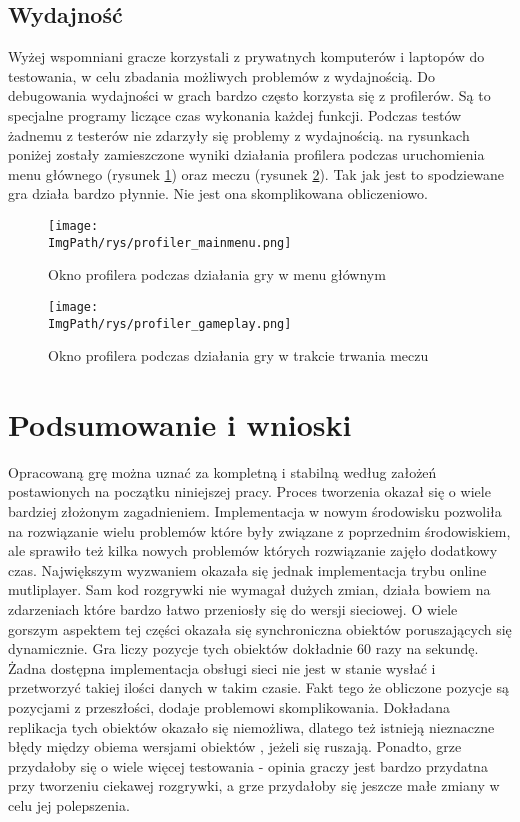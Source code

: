 \documentclass[a4paper,12pt,twoside,openany]{report}
\newcommand{\ImgPath}{.}
\begin{document}
\section{Wydajność}
Wyżej wspomniani gracze korzystali z prywatnych komputerów i laptopów do testowania, w celu zbadania możliwych problemów z wydajnością. Do debugowania wydajności w grach bardzo często korzysta się z profilerów. Są to specjalne programy liczące czas wykonania każdej funkcji. Podczas testów żadnemu z testerów nie zdarzyły się problemy z wydajnością. na rysunkach poniżej zostały zamieszczone wyniki działania profilera podczas uruchomienia menu głównego (rysunek \ref{profiler_mainmenu}) oraz meczu (rysunek \ref{profiler_gameplay}). Tak jak jest to spodziewane gra działa bardzo płynnie. Nie jest ona skomplikowana obliczeniowo.

\begin{figure}[H]
	\begin{center}
\centering
\texttt{[image: \\ImgPath/rys/profiler\_mainmenu.png]}
\end{center}
	\caption{Okno profilera podczas działania gry w menu głównym}
	\label{profiler_mainmenu}
\end{figure}

\begin{figure}[H]
	\begin{center}
\centering
\texttt{[image: \\ImgPath/rys/profiler\_gameplay.png]}
\end{center}
	\caption{Okno profilera podczas działania gry w trakcie trwania meczu}
	\label{profiler_gameplay}
\end{figure}

\chapter{Podsumowanie i wnioski }
Opracowaną grę można uznać za kompletną i stabilną według założeń postawionych na początku niniejszej pracy. Proces tworzenia okazał się o wiele bardziej złożonym zagadnieniem. Implementacja w nowym środowisku pozwoliła na rozwiązanie wielu problemów które były związane z poprzednim środowiskiem, ale sprawiło też kilka nowych problemów których rozwiązanie zajęło dodatkowy czas. Największym wyzwaniem okazała się jednak implementacja trybu online mutliplayer. Sam kod rozgrywki nie wymagał dużych zmian, działa bowiem na zdarzeniach które bardzo łatwo przeniosły się do wersji sieciowej. O wiele gorszym aspektem tej części okazała się synchroniczna obiektów poruszających się dynamicznie. Gra liczy pozycje tych obiektów dokładnie 60 razy na sekundę. Żadna dostępna implementacja obsługi sieci nie jest w stanie wysłać i przetworzyć takiej ilości danych w takim czasie. Fakt tego że obliczone pozycje są pozycjami z przeszłości, dodaje problemowi skomplikowania. Dokładana replikacja tych obiektów okazało się niemożliwa, dlatego też istnieją nieznaczne błędy między obiema wersjami obiektów , jeżeli się ruszają. Ponadto, grze przydałoby się o wiele więcej testowania - opinia graczy jest bardzo przydatna przy tworzeniu ciekawej rozgrywki, a grze przydałoby się jeszcze małe zmiany w celu jej polepszenia.
\end{document}
